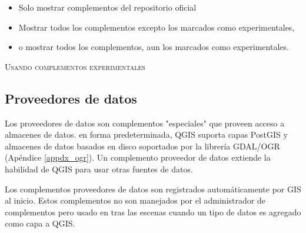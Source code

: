 \begin{itemize}
\item Solo mostrar complementos del repositorio oficial
\item Mostrar todos los complementos excepto los marcados como experimentales,
\item o mostrar todos los complementos, aun los marcados como experimentales.
\end{itemize}

\begin{Tip}
 \caption{\textsc{Usando complementos experimentales}}
\end{Tip}


\subsection{Proveedores de datos}

Los proveedores de datos son  complementos "especiales" que proveen acceso a almacenes de datos.
en forma predeterminada, QGIS suporta capas PostGIS y almacenes de datos basados en disco soportados por la librería GDAL/OGR (Apéndice \ref{appdx_ogr}).
Un complemento proveedor de datos extiende la habilidad de QGIS para usar otras fuentes de datos.

Los complementos proveedores de datos son registrados automáticamente por GIS al inicio.
Estos complementos no son manejados por el administrador de complementos pero usado en tras las escenas cuando un tipo de datos es agregado como capa a QGIS.
